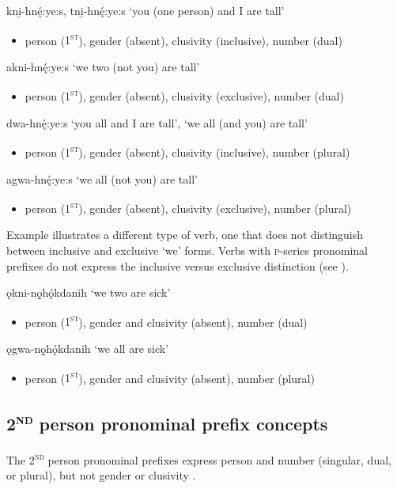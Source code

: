 \ea\label{ex:1stex200}
\ea kni̱-hnę́:ye:s, tni̱-hnę́:ye:s ‘you (one person) and I are tall’
\begin{itemize}
    \item person (\textsc{1\textsuperscript{st}}), gender (absent), clusivity (inclusive), number (dual)
\end{itemize} 
\ex akni-hnę́:ye:s ‘we two (not you) are tall’ 
\begin{itemize}
    \item person (\textsc{1\textsuperscript{st}}), gender (absent), clusivity (exclusive), number (dual)
\end{itemize}
\ex dwa-hnę́:ye:s ‘you all and I are tall’, ‘we all (and you) are tall’
\begin{itemize}
    \item person (\textsc{1\textsuperscript{st}}), gender (absent), clusivity (inclusive), number (plural)
\end{itemize}
\ex agwa-hnę́:ye:s ‘we all (not you) are tall’
\begin{itemize}
    \item  person (\textsc{1\textsuperscript{st}}), gender (absent), clusivity (exclusive), number (plural)
\end{itemize}
\z
\z

Example  illustrates a different type of verb, one that does not distinguish between inclusive and exclusive ‘we’ forms. Verbs with \textsc{p}-series pronominal prefixes do not express the inclusive versus exclusive distinction (see ).

\ea\label{ex:1stex300}
\ea ǫkni-nǫ̱hǫ́kdanih ‘we two are sick’
\begin{itemize}
    \item person (\textsc{1\textsuperscript{st}}), gender and clusivity (absent), number (dual)
\end{itemize}
\ex ǫgwa-nǫ̱hǫ́kdanih ‘we all are sick’
\begin{itemize}
    \item person (\textsc{1\textsuperscript{st}}), gender and clusivity (absent), number (plural)
\end{itemize} 
\z
\z


\subsection{\textsc{2\textsuperscript{nd}} person pronominal prefix concepts} \label{2nd person pronominal prefix concepts}
The \textsc{2\textsuperscript{nd}} person pronominal prefixes express person and number (singular, dual, or plural), but not gender or clusivity .

